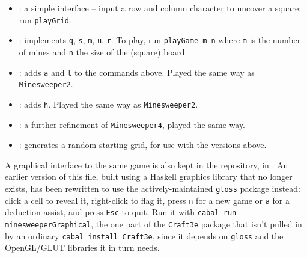 \begin{itemize}
\item {}: a simple interface -- input a row and column character to uncover a square; run \texttt{playGrid}.
\item {}: implements \texttt{q}, \texttt{s}, \texttt{m}, \texttt{u}, \texttt{r}. To play, run \texttt{playGame m n} where \texttt{m} is the number of mines and \texttt{n} the size of the (square) board.
\item {}: adds \texttt{a} and \texttt{t} to the commands above. Played the same way as \texttt{Minesweeper2}.
\item {}: adds \texttt{h}. Played the same way as \texttt{Minesweeper2}.
\item {}: a further refinement of \texttt{Minesweeper4}, played the same way.
\item {}: generates a random starting grid, for use with the versions above.
\end{itemize}

A graphical interface to the same game is also kept in the repository, in . An earlier version of this file, built using a Haskell graphics library that no longer exists, has been rewritten to use the actively-maintained \texttt{gloss} package instead: click a cell to reveal it, right-click to flag it, press \texttt{n} for a new game or \texttt{a} for a deduction assist, and press \texttt{Esc} to quit. Run it with \texttt{cabal run minesweeperGraphical}, the one part of the \texttt{Craft3e} package that isn't pulled in by an ordinary \texttt{cabal install Craft3e}, since it depends on \texttt{gloss} and the OpenGL/GLUT libraries it in turn needs.

